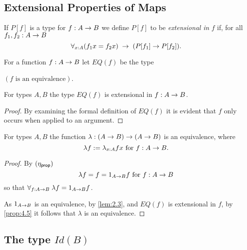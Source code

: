 \subsection{Extensional Properties of Maps}
\begin{defn}
If $P[f]$ is a type for $f:A\rightarrow B$ we define $P[f]$ to be {\em extensional in $f$} if, for all $f_1,f_2:A\rightarrow B$
  \[ \forall_{x:A}(f_1x=f_2x)\;\rightarrow\; (P[f_1]\rightarrow P[f_2]).\]
\end{defn} 
\begin{defn} For a function $f:A\rightarrow B$ let $EQ(f)$ be the type 
\begin{center}
{\em $(f\mbox{ is an equivalence})$}.
\end{center}
\end{defn}
\begin{thm}\label{prop:4.5}
For types $A,B$ the type $EQ(f)$ is extensional in $f:A\rightarrow B$.
\end{thm}
\begin{proof}  By examining the formal definition of $EQ(f)$ it is evident that $f$ only occurs when applied to an argument.
\end{proof}

\begin{cor} \label{cor:4.6}
For types $A,B$ the function $\lambda:(A\rightarrow B)\rightarrow(A\rightarrow B)$ is an equivalence, where 
  \[ \lambda f := \lambda_{x:A} fx\mbox{ for } f:A\rightarrow B.\]
\end{cor}
\begin{proof} By $(\eta_{\sf prop})$
  \[ \lambda f = f = 1_{A\rightarrow B}f\mbox{ for } f:A\rightarrow B\]
so that $\forall_{f:A\rightarrow B}\; \lambda f=1_{A\rightarrow B}f$.

As $1_{A\rightarrow B}$ is an equivalence, by \autoref{lem:2.3}, and $EQ(f)$ is extensional in $f$, by \autoref{prop:4.5} it follows that $\lambda$ is an equivalence.
\end{proof}

\subsection{The type $Id(B)$}

